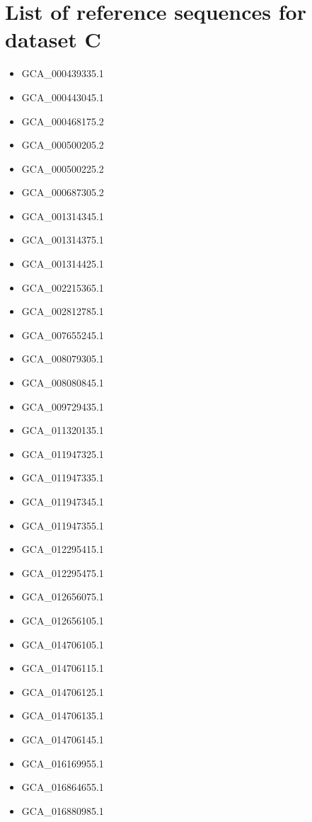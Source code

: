
\section{List of reference sequences for dataset C}
\label{sec:refseq}
\begin{itemize}
    \item GCA\_000439335.1
    \item GCA\_000443045.1
    \item GCA\_000468175.2
    \item GCA\_000500205.2
    \item GCA\_000500225.2
    \item GCA\_000687305.2
    \item GCA\_001314345.1
    \item GCA\_001314375.1
    \item GCA\_001314425.1
    \item GCA\_002215365.1
    \item GCA\_002812785.1
    \item GCA\_007655245.1
    \item GCA\_008079305.1
    \item GCA\_008080845.1
    \item GCA\_009729435.1
    \item GCA\_011320135.1
    \item GCA\_011947325.1
    \item GCA\_011947335.1
    \item GCA\_011947345.1
    \item GCA\_011947355.1
    \item GCA\_012295415.1
    \item GCA\_012295475.1
    \item GCA\_012656075.1
    \item GCA\_012656105.1
    \item GCA\_014706105.1
    \item GCA\_014706115.1
    \item GCA\_014706125.1
    \item GCA\_014706135.1
    \item GCA\_014706145.1
    \item GCA\_016169955.1
    \item GCA\_016864655.1
    \item GCA\_016880985.1

\end{itemize}
